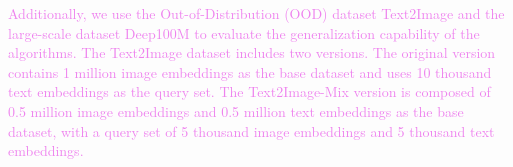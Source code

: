 \documentclass[sigconf, nonacm]{acmart}
\begin{document}
{	\textcolor{violet}{Additionally, we use the Out-of-Distribution (OOD) dataset Text2Image and the large-scale dataset Deep100M to evaluate the generalization capability of the algorithms. The Text2Image dataset includes two versions. The original version contains 1 million image embeddings as the base dataset and uses 10 thousand text embeddings as the query set. The Text2Image-Mix version is composed of 0.5 million image embeddings and 0.5 million text embeddings as the base dataset, with a query set of 5 thousand image embeddings and 5 thousand text embeddings.}
	

	
	
	
	
	
}
\end{document}
